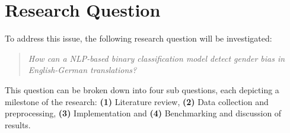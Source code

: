 \section{Research Question}

To address this issue, the following research question will be investigated:
\begin{quote}
    \textit{How can a NLP-based binary classification model detect gender bias in English-German translations?}
\end{quote}


\noindent This question can be broken down into four sub questions, each depicting a milestone of the research: \textbf{(1)} Literature review, \textbf{(2)} Data collection and preprocessing, \textbf{(3)} Implementation and \textbf{(4)} Benchmarking and discussion of results.


